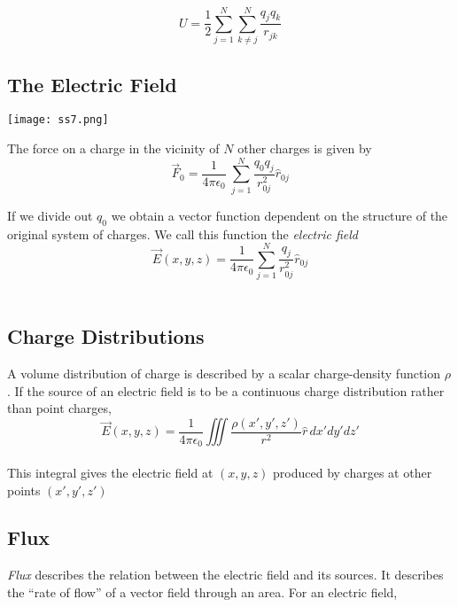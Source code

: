 \documentclass[svgnames]{article}
\begin{document}
\[ U = \frac{1}{2}\sum_{j=1}^N \sum_{k\neq j}^N \frac{q_jq_k}{r_{jk}} \]

\subsection{The Electric Field} 

\vspace{20px}

\begin{center}
\texttt{[image: ss7.png]}
\end{center} 


\vspace{20px}

The force on a charge in the vicinity of $N$ other charges is given by \\ 

\[ \vec{F}_0 = \frac{1}{4\pi\epsilon_0} \ \sum_{j=1}^N \frac{q_0q_j}{r_{0j}^2}\hat{r}_{0j} \]

If we divide out $q_0$ we obtain a vector function dependent on the structure of the original system of charges. We call this function the \textit{electric field} \\ 

\[ \vec{E}(x,y,z) = \frac{1}{4\pi\epsilon_0}\sum_{j=1}^N \frac{q_j}{r_{0j}^2}\hat{r}_{0j} \] \\


\subsection{Charge Distributions} 

A volume distribution of charge is described by a scalar charge-density function $\rho$. If the source of an electric field is to be a continuous charge distribution rather than point charges, \\

\[ \vec{E}(x,y,z) = \frac{1}{4\pi\epsilon_0} \iiint \frac{\rho(x',y',z')}{r^2} \hat{r} \, dx'dy'dz' \] \\

This integral gives the electric field at $(x,y,z)$ produced by charges at other points $(x',y',z')$

\subsection{Flux}
  

\textit{Flux} describes the relation between the electric field and its sources. It describes the ``rate of flow'' of a vector field through an area. For an electric field, \\
\end{document}
